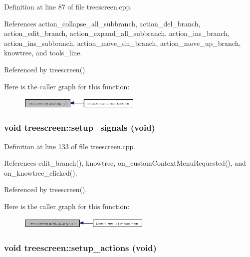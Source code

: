 Definition at line 87 of file treescreen.cpp.

References action\_\-collapse\_\-all\_\-subbranch, action\_\-del\_\-branch, action\_\-edit\_\-branch, action\_\-expand\_\-all\_\-subbranch, action\_\-ins\_\-branch, action\_\-ins\_\-subbranch, action\_\-move\_\-dn\_\-branch, action\_\-move\_\-up\_\-branch, knowtree, and tools\_\-line.

Referenced by treescreen().

Here is the caller graph for this function:\begin{figure}[H]
\begin{center}
\leavevmode
\includegraphics[width=166pt]{classtreescreen_428e0d2e2f10be1761f2d30343259910_icgraph}
\end{center}
\end{figure}
\subsubsection{\setlength{\rightskip}{0pt plus 5cm}void treescreen::setup\_\-signals (void)\hspace{0.3cm}{\tt  [private]}}\label{classtreescreen_b08b4831cde1a5b3065ea9d400eea67d}




Definition at line 133 of file treescreen.cpp.

References edit\_\-branch(), knowtree, on\_\-custom\-Context\-Menu\-Requested(), and on\_\-knowtree\_\-clicked().

Referenced by treescreen().

Here is the caller graph for this function:\begin{figure}[H]
\begin{center}
\leavevmode
\includegraphics[width=179pt]{classtreescreen_b08b4831cde1a5b3065ea9d400eea67d_icgraph}
\end{center}
\end{figure}
\subsubsection{\setlength{\rightskip}{0pt plus 5cm}void treescreen::setup\_\-actions (void)\hspace{0.3cm}{\tt  [private]}}\label{classtreescreen_a6e4728a4524289c2e933abc51d9cb20}




